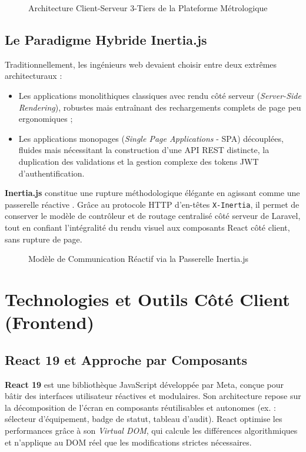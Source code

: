 \documentclass{bts-report}
\begin{document}
\begin{figure}[H]
  \centering
  
  \caption{Architecture Client-Serveur 3-Tiers de la Plateforme M\'etrologique}
  \label{fig:web-arch}
\end{figure}

\subsection{Le Paradigme Hybride Inertia.js}
Traditionnellement, les ing\'enieurs web devaient choisir entre deux extr\^emes architecturaux :
\begin{itemize}
  \item Les applications monolithiques classiques avec rendu c\^ot\'e serveur (\textit{Server-Side Rendering}), robustes mais entra\^inant des rechargements complets de page peu ergonomiques ;
  \item Les applications monopages (\textit{Single Page Applications} - SPA) d\'ecoupl\'ees, fluides mais n\'ecessitant la construction d'une API REST distincte, la duplication des validations et la gestion complexe des tokens JWT d'authentification.
\end{itemize}

\textbf{Inertia.js} constitue une rupture m\'ethodologique \'el\'egante en agissant comme une \og passerelle r\'eactive \fg. Gr\^ace au protocole HTTP d'en-t\^etes \texttt{X-Inertia}, il permet de conserver le mod\`ele de contr\^oleur et de routage centralis\'e c\^ot\'e serveur de Laravel, tout en confiant l'int\'egralit\'e du rendu visuel aux composants React c\^ot\'e client, sans rupture de page.

\begin{figure}[H]
  \centering
  
  \caption{Mod\`ele de Communication R\'eactif via la Passerelle Inertia.js}
  \label{fig:inertia-bridge}
\end{figure}

\section{Technologies et Outils C\^ot\'e Client (Frontend)}
\subsection{React 19 et Approche par Composants}
\textbf{React 19} est une biblioth\`eque JavaScript d\'evelopp\'ee par Meta, con\c{c}ue pour b\^atir des interfaces utilisateur r\'eactives et modulaires. Son architecture repose sur la d\'ecomposition de l'\'ecran en composants r\'eutilisables et autonomes (ex. : s\'electeur d'\'equipement, badge de statut, tableau d'audit). React optimise les performances gr\^ace \`a son \textit{Virtual DOM}, qui calcule les diff\'erences algorithmiques et n'applique au DOM r\'eel que les modifications strictes n\'ecessaires.
\end{document}
